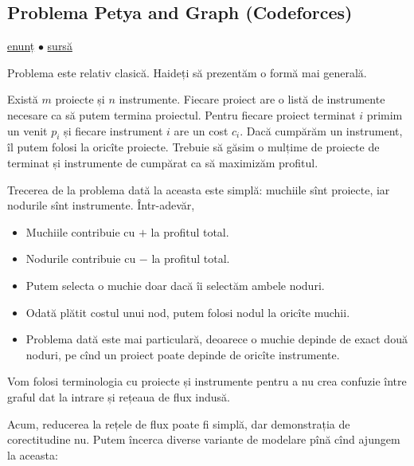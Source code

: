 \documentclass[../main.tex]{subfiles}
\begin{document}
\subsection{Problema Petya and Graph (Codeforces)}
\label{problem:petya-and-graph}

\href{https://codeforces.com/contest/1082/problem/G}{enunț}
$\bullet$
\hyperref[code:petya-and-graph]{sursă}

Problema este relativ clasică. Haideți să prezentăm o formă mai generală.

Există $m$ proiecte și $n$ instrumente. Fiecare proiect are o listă de instrumente necesare ca să putem termina proiectul. Pentru fiecare proiect terminat $i$ primim un venit $p_i$ și fiecare instrument $i$ are un cost $c_i$. Dacă cumpărăm un instrument, îl putem folosi la oricîte proiecte. Trebuie să găsim o mulțime de proiecte de terminat și instrumente de cumpărat ca să maximizăm profitul.

Trecerea de la problema dată la aceasta este simplă: muchiile sînt proiecte, iar nodurile sînt instrumente. Într-adevăr,

\begin{itemize}
  \item Muchiile contribuie cu $+$ la profitul total.

  \item Nodurile contribuie cu $-$ la profitul total.

  \item Putem selecta o muchie doar dacă îi selectăm ambele noduri.

  \item Odată plătit costul unui nod, putem folosi nodul la oricîte muchii.

  \item Problema dată este mai particulară, deoarece o muchie depinde de exact două noduri, pe cînd un proiect poate depinde de oricîte instrumente.
\end{itemize}

Vom folosi terminologia cu proiecte și instrumente pentru a nu crea confuzie între graful dat la intrare și rețeaua de flux indusă.

Acum, reducerea la rețele de flux poate fi simplă, dar demonstrația de corectitudine nu. Putem încerca diverse variante de modelare pînă cînd ajungem la aceasta:
\end{document}
